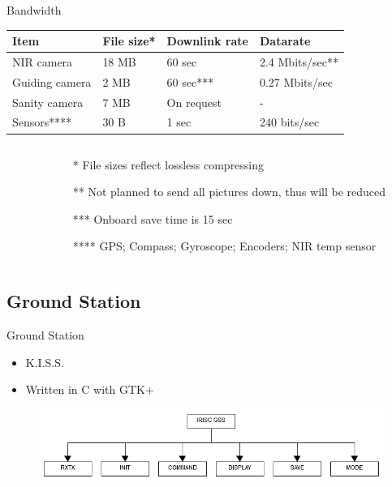 \documentclass[11pt, aspectratio=169]{beamer}
\begin{document}
\begin{frame}[c]{Bandwidth}
\centering
\begin{tabular}{| l | l | l | l |}
	\hline
	\textbf{Item} & \textbf{File size*} & \textbf{Downlink rate} & \textbf{Datarate} \\\hline\hline
	
	NIR camera		& 18 MB & 60 sec 	& 2.4 Mbits/sec** \\\hline
	Guiding camera	& 2 MB	& 60 sec***	& 0.27 Mbits/sec \\\hline
	Sanity camera	& 7 MB  & On request & - \\\hline
	Sensors****		& 30 B  & 1 sec 	& 240 bits/sec \\\hline
	

\end{tabular}
\newline

\begin{columns}[t]
\begin{column}{0.1\textwidth}
\end{column}
\begin{column}{0.9\textwidth}
\begin{enumerate}
	\small
	\item[*] File sizes reflect lossless compressing
	\item[**] Not planned to send all pictures down, thus will be reduced
	\item[***] Onboard save time is 15 sec
	\item[****] GPS; Compass; Gyroscope; Encoders; NIR temp sensor
\end{enumerate}
\end{column}
\end{columns}
\end{frame}

\subsection{Ground Station} 	%
\begin{frame}{Ground Station}
\begin{itemize}
	\item K.I.S.S.
	\item Written in C with GTK+
\end{itemize}
\begin{figure}
	\includegraphics[scale=0.4]{figures/images/GSS-tree.png}
\end{figure}
\end{frame}
\end{document}
